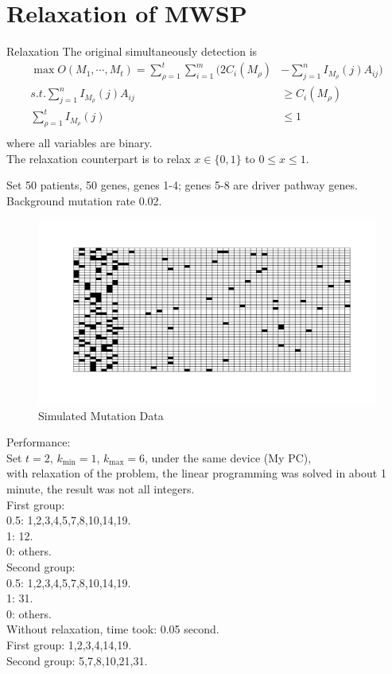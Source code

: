 \documentclass[xcolor=dvipsnames]{beamer}
\begin{document}
\section{Relaxation of MWSP}
\begin{frame}{Relaxation}
The original simultaneously detection is
\begin{displaymath}
\begin{split}
\max O(M_1,\cdots,M_t)=\sum_{\rho=1}^t\sum_{i=1}^m(2C_i(M_{\rho})&-\sum_{j=1}^nI_{M_{\rho}}(j)A_{ij})\\
s.t. \sum_{j=1}^nI_{M_{\rho}}(j)A_{ij}&\geqslant C_i(M_{\rho})\\
\sum_{\rho=1}^tI_{M_{\rho}}(j)&\leqslant 1\\
\end{split}
\end{displaymath}
where all variables are binary.\\
The relaxation counterpart is to relax $x\in\{0,1\}$ to $0\leqslant x\leqslant1$.
\end{frame}
\begin{frame}
Set 50 patients, 50 genes, genes 1-4; genes 5-8 are driver pathway genes. Background mutation rate 0.02.\\
\begin{figure}
\includegraphics[width=0.8\linewidth]{eightdata.png}
\caption{Simulated Mutation Data}
\end{figure}
\end{frame}
\begin{frame}
Performance:\\
Set $t=2$, $k_{\min}=1$, $k_{\max}=6$, under the same device (My PC),\\
with relaxation of the problem, the linear programming was solved in about 1 minute, the result was not all integers.\\
First group:\\
0.5: 1,2,3,4,5,7,8,10,14,19.\\
1: 12.\\
0: others.\\
Second group:\\
0.5: 1,2,3,4,5,7,8,10,14,19.\\
1: 31.\\
0: others.\\
Without relaxation, time took: 0.05 second.\\
First group: 1,2,3,4,14,19.\\
Second group: 5,7,8,10,21,31.\\
\end{frame}
\end{document}
